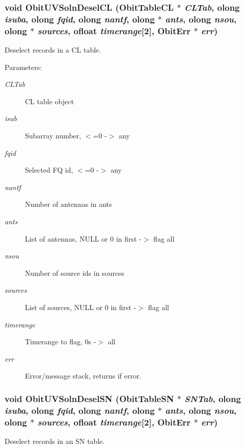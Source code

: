 \subsubsection{\setlength{\rightskip}{0pt plus 5cm}void Obit\-UVSoln\-Desel\-CL ({\bf Obit\-Table\-CL} $\ast$ {\em CLTab}, {\bf olong} {\em isuba}, {\bf olong} {\em fqid}, {\bf olong} {\em nantf}, {\bf olong} $\ast$ {\em ants}, {\bf olong} {\em nsou}, {\bf olong} $\ast$ {\em sources}, {\bf ofloat} {\em timerange}[2], {\bf Obit\-Err} $\ast$ {\em err})}\label{ObitUVSoln_8c_a30}


Deselect records in a CL table. 

\begin{Desc}
\item[Parameters:]
\begin{description}
\item[{\em CLTab}]CL table object \item[{\em isub}]Subarray number, $<$=0 -$>$ any \item[{\em fqid}]Selected FQ id, $<$=0 -$>$ any \item[{\em nantf}]Number of antennas in ants \item[{\em ants}]List of antennas, NULL or 0 in first -$>$ flag all \item[{\em nsou}]Number of source ids in sources \item[{\em sources}]List of sources, NULL or 0 in first -$>$ flag all \item[{\em timerange}]Timerange to flag, 0s -$>$ all \item[{\em err}]Error/message stack, returns if error. \end{description}
\end{Desc}
\subsubsection{\setlength{\rightskip}{0pt plus 5cm}void Obit\-UVSoln\-Desel\-SN ({\bf Obit\-Table\-SN} $\ast$ {\em SNTab}, {\bf olong} {\em isuba}, {\bf olong} {\em fqid}, {\bf olong} {\em nantf}, {\bf olong} $\ast$ {\em ants}, {\bf olong} {\em nsou}, {\bf olong} $\ast$ {\em sources}, {\bf ofloat} {\em timerange}[2], {\bf Obit\-Err} $\ast$ {\em err})}\label{ObitUVSoln_8c_a29}


Deselect records in an SN table. 

